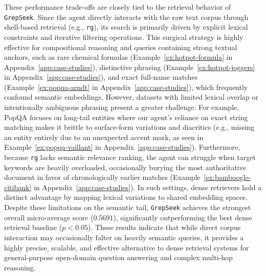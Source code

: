 \documentclass{article} %
\newcommand{\ourmethod}{\texttt{GrepSeek}\xspace}
\begin{document}
These performance trade-offs are closely tied to the retrieval behavior of \ourmethod{}. Since the agent directly interacts with the raw text corpus through shell-based retrieval (e.g., \texttt{rg}), its search is primarily driven by explicit lexical constraints and iterative filtering operations. This surgical strategy is highly effective for compositional reasoning and queries containing strong textual anchors, such as rare chemical formulas (Example~\ref{ex:hotpot-formula}  in Appendix~\ref{app:case-studies}), distinctive phrasing (Example~\ref{ex:hotpot-joggers} in Appendix~\ref{app:case-studies}), and exact full-name matches (Example~\ref{ex:popqa-arndt} in Appendix~\ref{app:case-studies}), which frequently confound semantic embeddings. However, datasets with limited lexical overlap or intentionally ambiguous phrasing present a greater challenge. For example, PopQA focuses on long-tail entities where our agent's reliance on exact string matching makes it brittle to surface-form variations and diacritics (e.g., missing an entity entirely due to an unexpected accent mark, as seen in Example~\ref{ex:popqa-vaillant} in Appendix~\ref{app:case-studies}). Furthermore, because \texttt{rg} lacks semantic relevance ranking, the agent can struggle when target keywords are heavily overloaded, occasionally burying the most authoritative document in favor of chronologically earlier matches (Example~\ref{ex:bamboogle-citibank} in Appendix~\ref{app:case-studies}). In such settings, dense retrievers hold a distinct advantage by mapping lexical variations to shared embedding spaces. Despite these limitations on the semantic tail, \ourmethod{} achieves the strongest overall micro-average score ($0.5691$), significantly outperforming the best dense retrieval baseline ($p < 0.05$). These results indicate that while direct corpus interaction may occasionally falter on heavily semantic queries, it provides a highly precise, scalable, and effective alternative to dense retrieval systems for general-purpose open-domain question answering and complex multi-hop reasoning.
\end{document}
